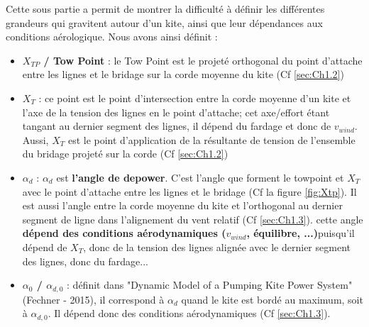 Cette sous partie a permit de montrer la difficulté à définir les différentes grandeurs qui gravitent autour d'un kite, ainsi que leur dépendances aux conditions aérologique. Nous avons ainsi définit :
\begin{itemize}
    \item \textbf{$X_{TP}$ / Tow Point} : le Tow Point est le projeté orthogonal du point d’attache entre les lignes et le bridage sur la corde moyenne du kite (Cf \ref{sec:Ch1.2})
    \item \textbf{$X_T$} : ce point est le point d’intersection entre la corde moyenne d’un kite et l’axe de la tension des lignes en le point d'attache; cet axe/effort étant tangant au dernier segment des lignes, il dépend du fardage et donc de $v_{wind}$. Aussi, $X_T$ est le point d’application de la résultante de tension de l’ensemble du bridage projeté sur la corde (Cf \ref{sec:Ch1.2})
    \item \textbf{$\alpha_d$} : $\alpha_d$ est \textbf{l'angle de depower}. C'est l'angle que forment le towpoint et $X_T$ avec le point d'attache entre les lignes et le bridage (Cf la figure \ref{fig:Xtp}). Il est aussi l'angle entre la corde moyenne du kite et l'orthogonal au dernier segment de ligne dans l'alignement du vent relatif (Cf \ref{sec:Ch1.3}). cette angle \textbf{dépend des conditions aérodynamiques ($v_{wind}$, équilibre, ...)}puisqu'il dépend de $X_T$, donc de la tension des lignes alignée avec le dernier segment des lignes, donc du fardage...
    \item \textbf{$\alpha_0$ / $\alpha_{d,0}$} : définit dans "Dynamic Model of a Pumping Kite Power System" (Fechner - 2015), il correspond à $\alpha_d$ quand le kite est bordé au maximum, soit à $\alpha_{d,0}$. Il dépend donc des conditions aérodynamiques (Cf \ref{sec:Ch1.3}).
\end{itemize}
